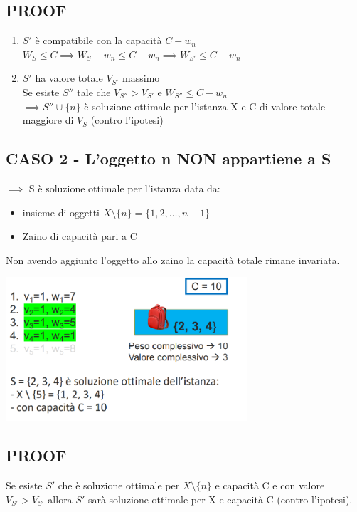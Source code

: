 \subsection*{PROOF} 
\begin{enumerate}
    \item $S'$ è compatibile con la capacità $C-w_n$\\
    $W_S \leq C \implies W_S - w_n \leq C - w_n \implies W_{S'} \leq C- w_n$
    \item $S'$ ha valore totale $V_{S'}$ massimo\\
    Se esiste $S''$ tale che $V_{S''} > V_{S'}$ e $W_{S''} \leq C-w_n$\\
    $\implies S'' \cup \{n\}$ è soluzione ottimale per l'istanza X e C di valore totale
    maggiore di $V_S$ (contro l'ipotesi)
\end{enumerate}
\subsection*{CASO 2 - L'oggetto n NON appartiene a S}
$\implies$ S è soluzione ottimale per l'istanza data da:
\begin{itemize}
    \item insieme di oggetti $X \setminus \{n\} = \{1,2,\dots,n-1\}$
    \item Zaino di capacità pari a C
\end{itemize}
Non avendo aggiunto l'oggetto allo zaino la capacità totale rimane invariata.
\begin{center}
    \includegraphics[width=90mm,scale=0.5]{chapters_ulerich/img/knapsack_n_notin_S.png}
\end{center}
\subsection*{PROOF}
Se esiste $S'$ che è soluzione ottimale per $X \setminus \{n\}$ e capacità C e con
valore $V_{S'} > V_{S'}$ allora $S'$ sarà soluzione ottimale per X e capacità C (contro
l'ipotesi).
